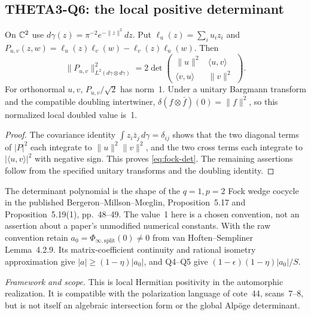 \documentclass[11pt]{article}
\newcommand{\framework}[1]{\par\smallskip\noindent\textit{Framework and scope.} #1\par}
\theoremstyle{definition}\newtheorem{definition}[theorem]{Definition}\newtheorem{remark}[theorem]{Remark}
\begin{document}
\subsection{THETA3-Q6: the local positive determinant}\label{Q6}
On $\mathbb C^2$ use $d\gamma(z)=\pi^{-2}e^{-\|z\|^2}dz$. Put
$\ell_u(z)=\sum_i u_i z_i$ and
$P_{u,v}(z,w)=\ell_u(z)\ell_v(w)-\ell_v(z)\ell_u(w)$.
Then
\begin{equation}\label{eq:fock-det}
 \|P_{u,v}\|^2_{L^2(d\gamma\otimes d\gamma)}
 =2\det\begin{pmatrix}\|u\|^2&\langle u,v\rangle\\
 \langle v,u\rangle&\|v\|^2\end{pmatrix}.
\end{equation}
For orthonormal $u,v$, $P_{u,v}/\sqrt2$ has norm~1. Under a unitary Bargmann transform and the compatible doubling intertwiner,
$\delta(f\otimes\bar f)(0)=\|f\|^2$, so this normalized local doubled value is~1.
\begin{proof}
The covariance identity $\int z_i\bar z_j\,d\gamma=\delta_{ij}$ shows that the two diagonal terms of $|P|^2$ each integrate to $\|u\|^2\|v\|^2$, and the two cross terms each integrate to $|\langle u,v\rangle|^2$ with negative sign. This proves \eqref{eq:fock-det}. The remaining assertions follow from the specified unitary transforms and the doubling identity.
\end{proof}
The determinant polynomial is the shape of the $q=1,p=2$ Fock wedge cocycle in the published Bergeron--Millson--M\oe glin, Proposition~5.17 and Proposition~5.19(1), pp.~48--49. The value~1 here is a chosen convention, not an assertion about a paper's unmodified numerical constants. With the raw convention retain
$a_0=\Phi_{\infty,\mathrm{split}}(0)\ne0$ from van Hoften--Sempliner Lemma~4.2.9. Its matrix-coefficient continuity and rational isometry approximation give
$|a|\geq(1-\eta)|a_0|$, and Q4--Q5 give
$(1-\epsilon)(1-\eta)|a_0|/S$.
\framework{This is local Hermitian positivity in the automorphic realization. It is compatible with the polarization language of cote~44, scans~7--8, but is not itself an algebraic intersection form or the global Alp\"oge determinant.}
\end{document}
